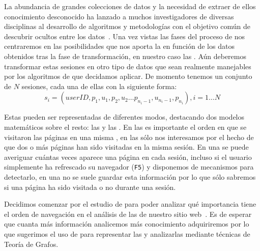 La abundancia de grandes colecciones de datos y la necesidad de extraer de ellos conocimiento desconocido ha lanzado a muchos investigadores de diversas disciplinas al desarrollo de algoritmos y metodologías con el objetivo común de descubrir \patrones ocultos entre los datos~\citep{HanKamberPei-DMConceptsAdnTechniques-2011}. Una vez vistas las fases del proceso de \wum nos centraremos en las posibilidades que nos aporta la \dm en función de los datos obtenidos tras la fase de transformación, en nuestro caso las \sns. Aún deberemos transformar estas sesiones en otro tipo de datos que sean realmente manejables por los algoritmos de \DM que decidamos aplicar. De momento tenemos un conjunto de $N$ sesiones, cada una de ellas con la siguiente forma:
$$ s_i = \left({userID}, p_1, u_1, p_2, u_2\ldots p_{n_i-1}, u_{n_i-1}, p_{n_i}\right), i = 1\ldots N $$

Estas \sns pueden ser representadas de diferentes modos, destacando dos modelos matemáticos sobre el resto: las \secuencias y las \transacciones. En las \secuencias es importante el orden en que se visitaron las páginas en una misma \sn, en las \transacciones sólo nos interesamos por el hecho de que dos o más páginas han sido visitadas en la misma sesión. En una \secuencia se puede averiguar cuántas veces aparece una página en cada sesión, incluso si el usuario simplemente ha refrescado su navegador (\texttt{F5}) y disponemos de mecanismos para detectarlo, en una \transaccion no se suele guardar esta información por lo que sólo sabremos si una página ha sido visitada o no durante una sesión.



Decidimos comenzar por el estudio de \secuencias para poder analizar qué importancia tiene el orden de navegación en el análisis de las \sns de nuestro sitio web~\citep{AgrawalSrikant-MiningSequentialPatterns-1995,SrikantAgrawal-MiningSequentialPatternsGeneralizationsAndPerformandeImprovements-1996,BorgesLevene-DataMiningOfUserNavigationPatterns-1999}. Es de esperar que cuanta más información analicemos más conocimiento adquiriremos por lo que sugerimos el uso de \mnw para representar las \sns y analizarlas mediante técnicas de Teoría de Grafos.
